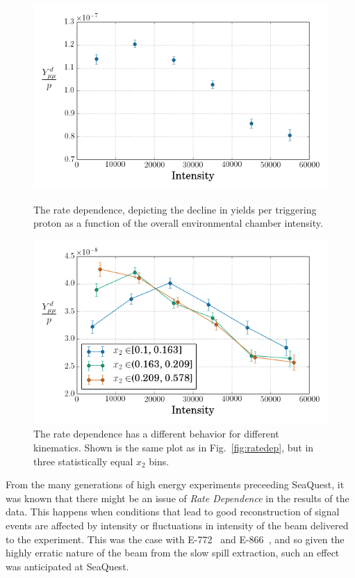 \begin{figure}
	\centering
	\begin{minipage}{0.48\textwidth}
		\centering
		\includegraphics[width=\textwidth]{figures/analysis/rate-dep.png}
		\caption{The rate dependence, depicting the decline in yields per triggering proton as a function of the overall environmental chamber intensity.}
		\label{fig:ratedep}
	\end{minipage}\hfill
	\begin{minipage}{0.48\textwidth}
		\centering
		\includegraphics[width=\textwidth]{figures/analysis/rate-dep-x2.png}
		\caption{The rate dependence has a different behavior for different kinematics. Shown is the same plot as in Fig.~\ref{fig:ratedep}, but in three statistically equal $x_2$ bins.}
		\label{fig:x2-ratedep}
	\end{minipage}
\end{figure}

From the many generations of high energy experiments preceeding SeaQuest, it was known that there might be an issue of \emph{Rate Dependence} in the results of the data. This happens when conditions that lead to good reconstruction of signal events are affected by intensity or fluctuations in intensity of the beam delivered to the experiment. This was the case with E-772~\cite{Wang:1991wa} and E-866~\cite{Towell:2001nh}, and so given the highly erratic nature of the beam from the slow spill extraction, such an effect was anticipated at SeaQuest.

